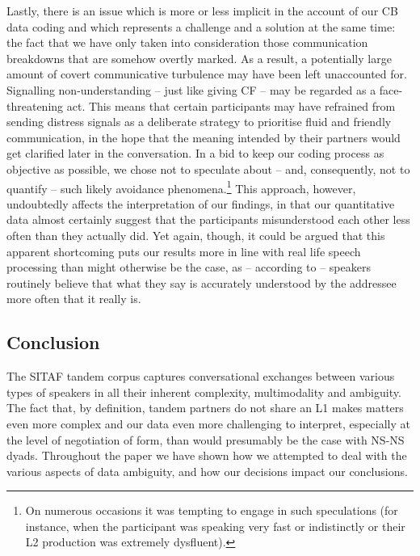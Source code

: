 \documentclass[output=paper,colorlinks,citecolor=brown,modfonts,nonflat]{../langscibook}
\begin{document}
Lastly, there is an issue which is more or less implicit in the account of our CB data coding and which represents a challenge and a solution at the same time: the fact that we have only taken into consideration those communication breakdowns that are somehow overtly marked. As a result, a potentially large amount of covert communicative turbulence may have been left unaccounted for. Signalling non-understanding – just like giving CF – may be regarded as a face-threatening act. This means that certain participants may have refrained from sending distress signals as a deliberate strategy to prioritise fluid and friendly communication, in the hope that the meaning intended by their partners would get clarified later in the conversation. In a bid to keep our coding process as objective as possible, we chose not to speculate about – and, consequently, not to quantify – such likely avoidance phenomena.\footnote{ {On numerous occasions it was tempting to engage in such speculations (for instance, when the participant was speaking very fast or indistinctly or their L2 production was extremely dysfluent).}} This approach, however, undoubtedly affects the interpretation of our findings, in that our quantitative data almost certainly suggest that the participants misunderstood each other less often than they actually did. Yet again, though, it could be argued that this apparent shortcoming puts our results more in line with real life speech processing than might otherwise be the case, as – according to \citet{Keysar2007} – speakers routinely believe that what they say is accurately understood by the addressee more often that it really is.

\subsection{Conclusion}\label{sec:scheuer:6.3}

The SITAF tandem corpus captures conversational exchanges between various types of speakers in all their inherent complexity, multimodality and ambiguity. The fact that, by definition, tandem partners do not share an L1 makes matters even more complex and our data even more challenging to interpret, especially at the level of negotiation of form, than would presumably be the case with NS-NS dyads. Throughout the paper we have shown how we attempted to deal with the various aspects of data ambiguity, and how our decisions impact our conclusions. 
\end{document}
